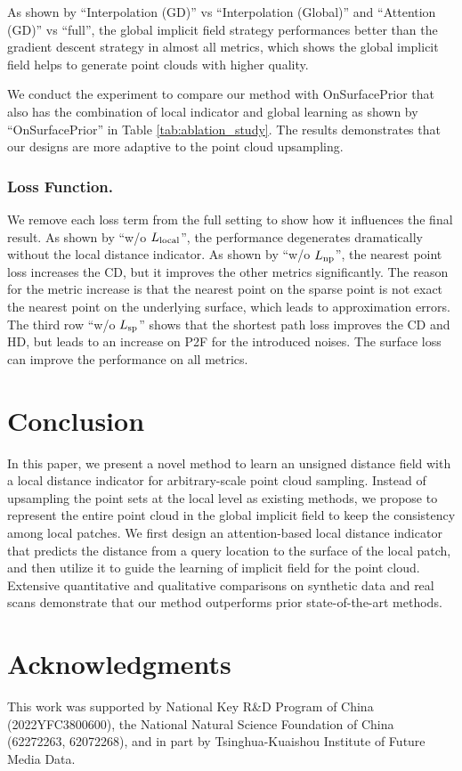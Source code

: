 \documentclass[letterpaper]{article} %
\begin{document}
As shown by ``Interpolation (GD)'' vs ``Interpolation (Global)'' and ``Attention (GD)'' vs ``full'', the global implicit field strategy performances better than the gradient descent strategy in almost all metrics, which shows the global implicit field helps to generate point clouds with higher quality.

We conduct the experiment to compare our method with OnSurfacePrior \cite{ma2022reconstructing} that also has the combination of local indicator and global learning as shown by ``OnSurfacePrior'' in Table \ref{tab:ablation_study}. The results demonstrates that our designs are more adaptive to the point cloud upsampling. 

\subsubsection{Loss Function.}  We remove each loss term from the full setting to show how it influences the final result. As shown by ``w/o $L_{\rm{local}}$'', the performance degenerates dramatically without the local distance indicator. As shown by ``w/o $L_{\rm{np}}$'', the nearest point loss increases the CD, but it improves the other metrics significantly. The reason for the metric increase is that the nearest point on the sparse point is not exact the nearest point on the underlying surface, which leads to approximation errors. The third row ``w/o $L_{\rm{sp}}$'' shows that the shortest path loss improves the CD and HD, but leads to an increase on P2F for the introduced noises. The surface loss can improve the performance on all metrics.


\section{Conclusion}
In this paper, we present a novel method to learn an unsigned distance field with a local distance indicator for arbitrary-scale point cloud sampling. Instead of upsampling the point sets at the local level as existing methods, we propose to represent the entire point cloud in the global implicit field to keep the consistency among local patches. We first design an attention-based local distance indicator that predicts the distance from a query location to the surface of the local patch, and then utilize it to guide the learning of implicit field for the point cloud.  Extensive quantitative and qualitative comparisons on synthetic data and real scans demonstrate that our method outperforms prior state-of-the-art methods.

\section{Acknowledgments}
This work was supported by National Key R\&D Program of China (2022YFC3800600), the National Natural Science Foundation of China (62272263, 62072268), and in part by Tsinghua-Kuaishou Institute of Future Media Data.


\end{document}
